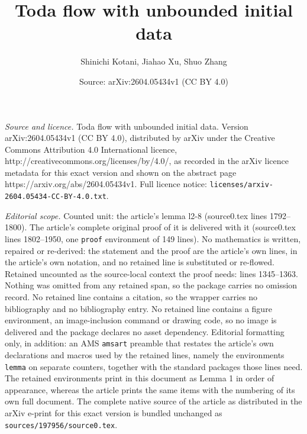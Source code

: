 \documentclass[10pt,a4paper]{amsart}
\title{Toda flow with unbounded initial data}
\author{Shinichi Kotani, Jiahao Xu, Shuo Zhang}
\date{Source: arXiv:2604.05434v1 (CC BY 4.0)}
\begin{document}
\maketitle

\noindent\emph{Source and licence.} Toda flow with unbounded initial data. Version arXiv:2604.05434v1 (CC BY 4.0), distributed by arXiv under the Creative Commons Attribution 4.0 International licence, http://creativecommons.org/licenses/by/4.0/, as recorded in the arXiv licence metadata for this exact version and shown on the abstract page https://arxiv.org/abs/2604.05434v1. Full licence notice: \texttt{licenses/arxiv-2604.05434-CC-BY-4.0.txt}.\par\smallskip

\noindent\textit{Editorial scope.} Counted unit: the article's lemma l2-8 (source0.tex lines 1792--1800). The article's complete original proof of it is delivered with it (source0.tex lines 1802--1950, one \texttt{proof} environment of 149 lines). No mathematics is written, repaired or re-derived: the statement and the proof are the article's own lines, in the article's own notation, and no retained line is substituted or re-flowed.  Retained uncounted as the source-local context the proof needs: lines 1345--1363.  Nothing was omitted from any retained span, so the package carries no omission record.  No retained line contains a citation, so the wrapper carries no bibliography and no bibliography entry.  No retained line contains a figure environment, an image-inclusion command or drawing code, so no image is delivered and the package declares no asset dependency.  Editorial formatting only, in addition: an AMS \texttt{amsart} preamble that restates the article's own declarations and macros used by the retained lines, namely the environments \texttt{lemma} on separate counters, together with the standard packages those lines need.  The retained environments print in this document as Lemma 1 in order of appearance, whereas the article prints the same items with the numbering of its own full document.  The complete native source of the article as distributed in the arXiv e-print for this exact version is bundled unchanged as \texttt{sources/197956/source0.tex}.
\end{document}
